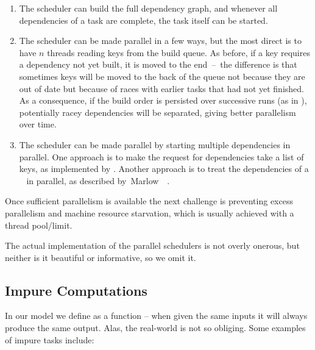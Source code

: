 \begin{enumerate}
\item The  scheduler can build the full dependency graph, and
whenever all dependencies of a task are complete, the task itself can be
started.

\item The  scheduler can be made parallel in a few ways, but the
most direct is to have $n$ threads reading keys from the build queue. As before,
if a key requires a dependency not yet built, it is moved to the end~--~the
difference is that sometimes keys will be moved to the back of the queue not
because they are out of date but because of races with earlier tasks that had
not yet finished. As a consequence, if the build order is persisted over
successive runs (as in \Excel), potentially racey dependencies will be
separated, giving better parallelism over time.

\item The  scheduler can be made parallel by starting multiple
dependencies in parallel. One approach is to make the request for dependencies
take a list of keys, as implemented by \Shake. Another approach is to treat the
 dependencies of a ~ in parallel, as
described by~Marlow~\etal~.
\end{enumerate}

Once sufficient parallelism is available the next challenge is preventing excess
parallelism and machine resource starvation, which is usually achieved with a
thread pool/limit.

The actual implementation of the parallel schedulers is not overly onerous, but
neither is it beautiful or informative, so we omit it.

\subsection{Impure Computations}\label{sec-non-determinism}

In our model we define  as a function -- when given the same inputs
it will always produce the same output. Alas, the real-world is not so obliging.
Some examples of impure tasks include:

